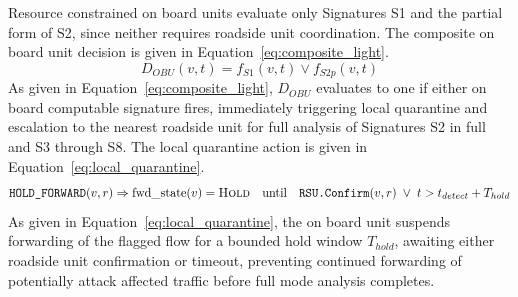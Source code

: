 \documentclass[final,5p,twocolumn]{elsarticle}
\theoremstyle{remark}
\theoremstyle{plain}
\begin{document}
Resource constrained on board units evaluate only Signatures S1 and the
partial form of S2, since neither requires roadside unit coordination. The
composite on board unit decision is given in
Equation~\eqref{eq:composite_light}.
\begin{equation}
	D_{OBU}(v,t) = f_{S1}(v,t) \lor f_{S2p}(v,t)
	\label{eq:composite_light}
\end{equation}
As given in Equation~\eqref{eq:composite_light}, $D_{OBU}$ evaluates to one
if either on board computable signature fires, immediately triggering local
quarantine and escalation to the nearest roadside unit for full analysis of
Signatures S2 in full and S3 through S8. The local quarantine action is
given in Equation~\eqref{eq:local_quarantine}.
\begin{equation}
	\texttt{HOLD\_FORWARD}(v,r) \Rightarrow \text{fwd\_state}(v) = \textsc{Hold} \quad \text{until} \quad \texttt{RSU.Confirm}(v,r) \;\lor\; t > t_{detect} + T_{hold}
	\label{eq:local_quarantine}
\end{equation}
As given in Equation~\eqref{eq:local_quarantine}, the on board unit suspends
forwarding of the flagged flow for a bounded hold window $T_{hold}$, awaiting
either roadside unit confirmation or timeout, preventing continued
forwarding of potentially attack affected traffic before full mode analysis
completes.
\end{document}
